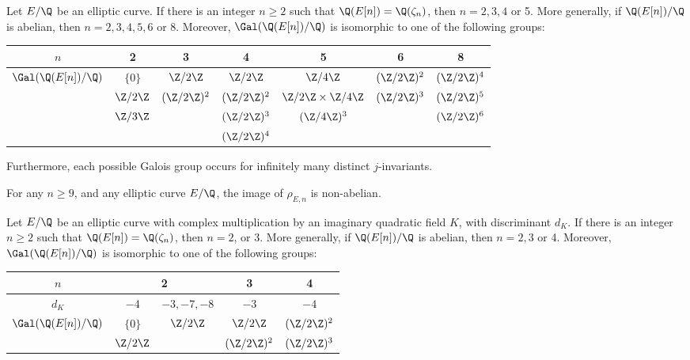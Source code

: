 \begin{thm} %
Let $E/\Q$ be an elliptic curve. If there is an integer $n \geq 2$ such that $\Q(E[n])= \Q(\zeta_n)$, then $n= 2, 3, 4$ or 5. More generally, if $\Q(E[n])/\Q$ is abelian, then $n= 2, 3, 4, 5, 6$ or 8. Moreover, $\Gal(\Q(E[n])/\Q)$ is isomorphic to one of the following groups:
        \begin{table}[!ht]
        \centering
        \begin{tabular}{|c||c|c|c|c|c|c|} \hline
        $n$ & 2 & 3 & 4 & 5 & 6 & 8 \\ \hline
        \multirow{4}{*}{$\Gal(\Q(E[n])/\Q)$} & $\{0\}$ & $\Z/2\Z$ & $\Z/2\Z$ & $\Z/4\Z$ & $(\Z/2\Z)^2$ & $(\Z/2\Z)^4$ \\
         & $\Z/2\Z$ & $(\Z/2\Z)^2$ & $(\Z/2\Z)^2$ & $\Z/2\Z \times \Z/4\Z$ & $(\Z/2\Z)^3$ & $(\Z/2\Z)^5$ \\
         & $\Z/3\Z$ &  & $(\Z/2\Z)^3$ & $(\Z/4\Z)^3$ &  & $(\Z/2\Z)^6$ \\
         &  &  & $(\Z/2\Z)^4$ &  &  &  \\ \hline
        \end{tabular}
        \end{table}
Furthermore, each possible Galois group occurs for infinitely many distinct $j$-invariants. 
\end{thm}


\begin{cor} %
For any $n \geq 9$, and any elliptic curve $E/\Q$, the image of $\rho_{E,n}$ is non-abelian. 
\end{cor}


\begin{thm} %
Let $E/\Q$ be an elliptic curve with complex multiplication by an imaginary quadratic field $K$, with discriminant $d_K$. If there is an integer $n \geq 2$ such that $\Q(E[n])= \Q(\zeta_n)$, then $n= 2$, or 3. More generally, if $\Q(E[n])/\Q$ is abelian, then $n= 2, 3$ or 4. Moreover, $\Gal(\Q(E[n])/\Q)$ is isomorphic to one of the following groups:
        \begin{table}[!ht]
        \centering
        \begin{tabular}{|c|c|c|c|c|} \hline
        $n$ & \multicolumn{2}{c|}{2} & 3 & 4 \\ \hline
        $d_K$ & $-4$ & $-3, -7, -8$ & $-3$ & $-4$ \\ \hline
        \multirow{2}{*}{$\Gal(\Q(E[n])/\Q)$} & $\{0\}$ & $\Z/2\Z$ & $\Z/2\Z$ & $(\Z/2\Z)^2$ \\
         & $\Z/2\Z$ &  & $(\Z/2\Z)^2$ & $(\Z/2\Z)^3$ \\ \hline
        \end{tabular}
        \end{table}
\end{thm}


